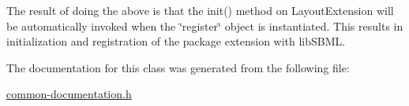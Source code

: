 The result of doing the above is that the {\ttfamily init()} method on {\ttfamily Layout\+Extension} will be automatically invoked when the \char`\"{}register\char`\"{} object is instantiated. This results in initialization and registration of the package extension with lib\+S\+B\+ML. 

The documentation for this class was generated from the following file\+:\begin{DoxyCompactItemize}
\item 
\hyperlink{common-documentation_8h}{common-\/documentation.\+h}\end{DoxyCompactItemize}
